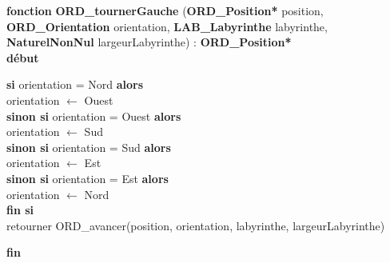 \documentclass[a4paper, 11pt]{article}
\begin{document}
\noindent\textbf{fonction} \textbf{ORD\_tournerGauche} (\textbf{ORD\_Position*} position, \textbf{ORD\_Orientation} orientation, \textbf{LAB\_Labyrinthe} labyrinthe, \textbf{NaturelNonNul} largeurLabyrinthe) : \textbf{ORD\_Position*}\\
\textbf{début}
\begin{flushleft}
    \hspace*{1cm}\textbf{si} orientation = Nord \textbf{alors}\\
    \hspace*{2cm}orientation $\gets$ Ouest\\
    \hspace*{1cm}\textbf{sinon si} orientation = Ouest \textbf{alors}\\
    \hspace*{2cm}orientation $\gets$ Sud\\
    \hspace*{1cm}\textbf{sinon si} orientation = Sud \textbf{alors}\\
    \hspace*{2cm}orientation $\gets$ Est\\
    \hspace*{1cm}\textbf{sinon si} orientation = Est \textbf{alors}\\
    \hspace*{2cm}orientation $\gets$ Nord\\
    \hspace*{1cm}\textbf{fin si}\\
    \hspace*{1cm}retourner ORD\_avancer(position, orientation, labyrinthe, largeurLabyrinthe)
\end{flushleft}
\textbf{fin}\\
\end{document}
